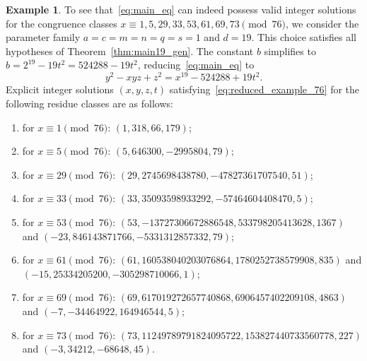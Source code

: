 \documentclass[11pt,a4paper]{amsart}
\theoremstyle{plain}
\theoremstyle{definition}
\newtheorem{example}[theorem]{Example}
\begin{document}
\begin{example}
To see that~\eqref{eq:main_eq} can indeed possess valid integer solutions for the congruence classes $x \equiv 1, 5, 29, 33, 53, 61, 69, 73 \pmod{76}$, we consider the parameter family $a=c=m=n=q=s=1$ and $d=19$. This choice satisfies all hypotheses of Theorem~\ref{thm:main19_gen}. The constant $b$ simplifies to $b = 2^{19} - 19t^2 = 524288 - 19t^2$, reducing~\eqref{eq:main_eq} to
\begin{equation}\label{eq:reduced_example_76}
    y^2 - xyz + z^2 = x^{19} - 524288 + 19t^2.
\end{equation}
Explicit integer solutions $(x, y, z, t)$ satisfying~\eqref{eq:reduced_example_76} for the following residue classes are as follows:
\begin{enumerate}[label=(\alph*)]
    \item for \textbf{$x \equiv 1 \pmod{76}$}: 
    $(1, 318, 66, 179)$;
    
    \item for \textbf{$x \equiv 5 \pmod{76}$}: 
    $(5, 646300, -2995804, 79)$;
    
    \item for \textbf{$x \equiv 29 \pmod{76}$}: 
    $(29, \allowbreak 2745698438780, \allowbreak -47827361707540, 51)$;
    
    \item for \textbf{$x \equiv 33 \pmod{76}$}: 
    $(33, \allowbreak 35093598933292, \allowbreak -57464604408470, 5)$;
    
    \item for \textbf{$x \equiv 53 \pmod{76}$}: 
    $(53, \allowbreak -13727306672886548, \allowbreak 533798205413628, 1367)$ and 
    $(-23, \allowbreak 846143871766, \allowbreak -5331312857332, 79)$;
    
    \item for \textbf{$x \equiv 61 \pmod{76}$}: 
    $(61, \allowbreak 160538040203076864, \allowbreak 1780252738579908, 835)$ and 
    $(-15, \allowbreak 25334205200, \allowbreak -305298710066, 1)$;
    
    \item for \textbf{$x \equiv 69 \pmod{76}$}: 
    $(69, \allowbreak 617019272657740868, \allowbreak 6906457402209108, 4863)$ and 
    $(-7,\allowbreak -34464922, 164946544, 5)$;
    
    \item for \textbf{$x \equiv 73 \pmod{76}$}: 
    $(73, \allowbreak 11249789791824095722, \allowbreak 153827440733560778, 227)$ and 
    $(-3, 34212, -68648, 45)$.
\end{enumerate}
\end{example}
\end{document}
